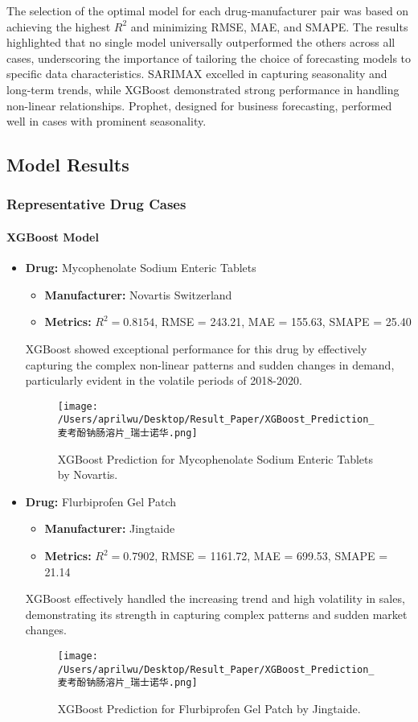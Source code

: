 \documentclass[journal]{IEEEtran}
\begin{document}
The selection of the optimal model for each drug-manufacturer pair was based on achieving the highest $R^2$ and minimizing RMSE, MAE, and SMAPE. The results highlighted that no single model universally outperformed the others across all cases, underscoring the importance of tailoring the choice of forecasting models to specific data characteristics. SARIMAX excelled in capturing seasonality and long-term trends, while XGBoost demonstrated strong performance in handling non-linear relationships. Prophet, designed for business forecasting, performed well in cases with prominent seasonality.

\subsection{Model Results}

\subsubsection{Representative Drug Cases}

\paragraph{XGBoost Model} %
\begin{itemize}
\item \textbf{Drug:} Mycophenolate Sodium Enteric Tablets
\begin{itemize}
\item \textbf{Manufacturer:} Novartis Switzerland
\item \textbf{Metrics:} $R^2 = 0.8154$, RMSE = 243.21, MAE = 155.63, SMAPE = 25.40
\end{itemize}
XGBoost showed exceptional performance for this drug by effectively capturing the complex non-linear patterns and sudden changes in demand, particularly evident in the volatile periods of 2018-2020.
\begin{figure}[H]
\centering
\texttt{[image: /Users/aprilwu/Desktop/Result\_Paper/XGBoost\_Prediction\_麦考酚钠肠溶片\_瑞士诺华.png]}
\caption{XGBoost Prediction for Mycophenolate Sodium Enteric Tablets by Novartis.}
\label{fig:mycophenolate}
\end{figure}
\item \textbf{Drug:} Flurbiprofen Gel Patch
\begin{itemize}
\item \textbf{Manufacturer:} Jingtaide
\item \textbf{Metrics:} $R^2 = 0.7902$, RMSE = 1161.72, MAE = 699.53, SMAPE = 21.14
\end{itemize}
XGBoost effectively handled the increasing trend and high volatility in sales, demonstrating its strength in capturing complex patterns and sudden market changes.
\begin{figure}[H]
\centering
\texttt{[image: /Users/aprilwu/Desktop/Result\_Paper/XGBoost\_Prediction\_麦考酚钠肠溶片\_瑞士诺华.png]}
\caption{XGBoost Prediction for Flurbiprofen Gel Patch by Jingtaide.}
\label{fig:flurbiprofen}
\end{figure}
\end{itemize}
\end{document}
